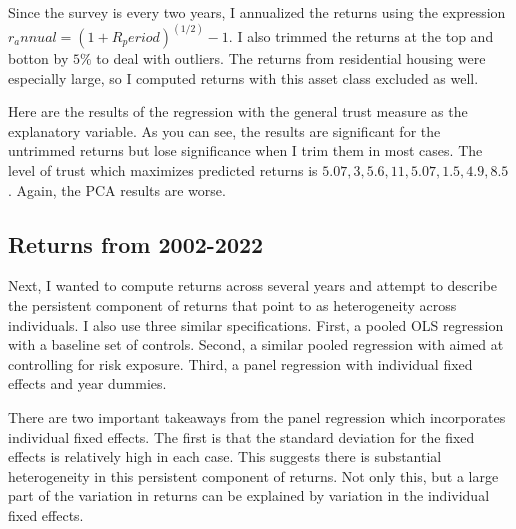 \par Since the survey is every two years, I annualized the returns using the expression $r_annual = (1 + R_period)^(1/2) - 1$. I also trimmed the returns at the top and botton by $5\%$ to deal with outliers. The returns from residential housing were especially large, so I computed returns with this asset class excluded as well. 

\par Here are the results of the regression with the general trust measure as the explanatory variable. As you can see, the results are significant for the untrimmed returns but lose significance when I trim them in most cases. The level of trust which maximizes predicted returns is  $5.07, 3, 5.6, 11, 5.07, 1.5, 4.9, 8.5$. Again, the PCA results are worse. 

\begin{landscape}



\end{landscape}

\begin{landscape}



\end{landscape}

\subsection{Returns from 2002-2022}

\par Next, I wanted to compute returns across several years and attempt to describe the persistent component of returns that \cite{aflgdmlp20} point to as heterogeneity across individuals. I also use three similar specifications. First, a pooled OLS regression with a baseline set of controls. Second, a similar pooled regression with aimed at controlling for risk exposure. Third, a panel regression with individual fixed effects and year dummies.

\par




\par 






\par There are two important takeaways from the panel regression which incorporates individual fixed effects. The first is that the standard deviation for the fixed effects is relatively high in each case. This suggests there is substantial heterogeneity in this persistent component of returns. Not only this, but a large part of the variation in returns can be explained by variation in the individual fixed effects. 


